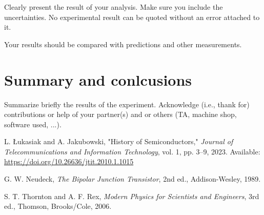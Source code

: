 \documentclass[12pt,letterpaper,onecolumn]{article}
\begin{document}
Clearly present the result of your analysis. Make sure
you include the uncertainties. No experimental result
can be quoted without an error attached to it.

Your results should be compared with predictions and other
measurements.



\section{Summary and conlcusions}

Summarize briefly the results of the experiment.
Acknowledge (i.e., thank for) contributions or help
of your partner(s) and or
others (TA, machine shop, software used, ...).


\begin{thebibliography}{9}

L. Łukasiak and A. Jakubowski, 
"History of Semiconductors," 
\textit{Journal of Telecommunications and Information Technology}, vol. 1, pp. 3–9, 2023. 
Available: \url{https://doi.org/10.26636/jtit.2010.1.1015}

G. W. Neudeck, 
\textit{The Bipolar Junction Transistor}, 2nd ed., 
Addison-Wesley, 1989.

S. T. Thornton and A. F. Rex, 
\textit{Modern Physics for Scientists and Engineers}, 3rd ed., 
Thomson, Brooks/Cole, 2006.

\end{thebibliography}

\end{document}
